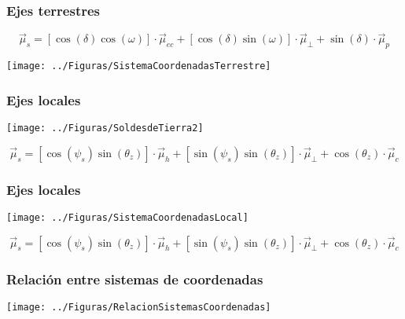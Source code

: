 \documentclass[xcolor=dvipsnames]{beamer}
\begin{document}
\begin{frame}[plain]
  \frametitle{Ejes terrestres}

\[
\vec{\mu}_{s}=\left[\cos\left(\delta\right)\cos\left(\omega\right)\right]\cdot\vec{\mu}_{ec}+\left[\cos\left(\delta\right)\sin\left(\omega\right)\right]\cdot\vec{\mu}_{\bot}+\sin\left(\delta\right)\cdot\vec{\mu}_{p}\]


\texttt{[image: ../Figuras/SistemaCoordenadasTerrestre]}


\end{frame}

\begin{frame}[plain]
  \frametitle{Ejes locales}

  \texttt{[image: ../Figuras/SoldesdeTierra2]}

\[
\vec{\mu}_{s}=\left[\cos\left(\psi_{s}\right)\sin\left(\theta_{z}\right)\right]\cdot\vec{\mu}_{h}+\left[\sin\left(\psi_{s}\right)\sin\left(\theta_{z}\right)\right]\cdot\vec{\mu}_{\bot}+\cos\left(\theta_{z}\right)\cdot\vec{\mu}_{c}\]



\end{frame}

\begin{frame}[plain]
  \frametitle{Ejes locales}

  \texttt{[image: ../Figuras/SistemaCoordenadasLocal]}

\[
\vec{\mu}_{s}=\left[\cos\left(\psi_{s}\right)\sin\left(\theta_{z}\right)\right]\cdot\vec{\mu}_{h}+\left[\sin\left(\psi_{s}\right)\sin\left(\theta_{z}\right)\right]\cdot\vec{\mu}_{\bot}+\cos\left(\theta_{z}\right)\cdot\vec{\mu}_{c}\]


\end{frame}

\begin{frame}
  \frametitle{Relación entre sistemas de coordenadas}

  \begin{center}
    \texttt{[image: ../Figuras/RelacionSistemasCoordenadas]}
    \par\end{center}




\end{frame}
\end{document}
